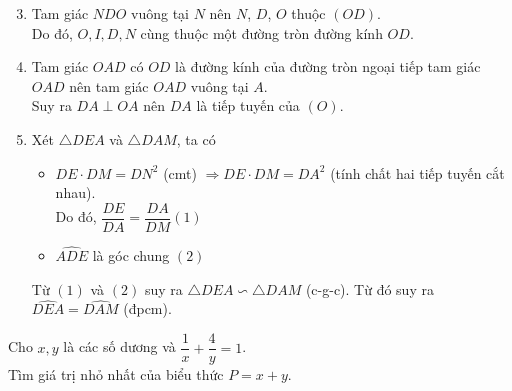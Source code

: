 \begin{bt}
{{	}
\begin{enumerate}
	\setcounter{enumi}{2}
	\item[] Tam giác $ NDO $ vuông tại $ N $ nên $ N $, $ D $, $ O $ thuộc $ (OD) $.\\
	Do đó, $ O,I,D,N $ cùng thuộc một đường tròn đường kính $ OD $.
	\item Tam giác $ OAD $ có $ OD $ là đường kính của đường tròn ngoại tiếp tam giác $ OAD $ nên tam giác $ OAD $ vuông tại $ A $.\\ Suy ra $ DA\perp OA $ nên $ DA $ là tiếp tuyến của $ (O) $.
	\item Xét $ \triangle DEA $ và $ \triangle DAM$, ta có
	\begin{itemize}
		\item $ DE\cdot DM=DN^2 $ (cmt) $ \Rightarrow DE\cdot DM=DA^2 $ (tính chất hai tiếp tuyến cắt nhau).\\ Do đó, $ \dfrac{DE}{DA}=\dfrac{DA}{DM} $\hfill $ (1) $
		\item $ \widehat{ADE} $ là góc chung \hfill $ (2) $
	\end{itemize}
Từ $ (1) $ và $ (2) $ suy ra $ \triangle DEA\backsim \triangle DAM $ (c-g-c). Từ đó suy ra $ \widehat{DEA}=\widehat{DAM} $ (đpcm).
\end{enumerate}
}
\end{bt}

\begin{bt}%
	Cho $ x,y $ là các số dương và $ \dfrac{1}{x}+\dfrac{4}{y}=1 $.\\Tìm giá trị nhỏ nhất của biểu thức $ P=x+y $.
\end{bt}
